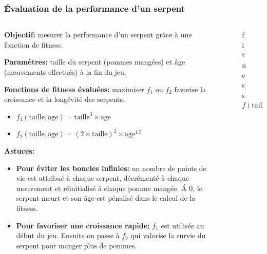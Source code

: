 \documentclass[10pt]{beamer}
\begin{document}
\begin{frame}
\frametitle{\'Evaluation de la performance d'un serpent}
\begin{columns}[T]
\begin{column}{0.60\textwidth}
\footnotesize
\textbf{Objectif:} mesurer la performance d'un serpent grâce à une fonction de fitness.

\vspace{0.1cm}
\textbf{Paramètres:} taille du serpent (pommes mangées) et âge (mouvements effectués) à la fin du jeu.

\vspace{0.1cm}
\textbf{Fonctions de fitness évaluées:} maximiser $f_1$ ou $f_2$ favorise la croissance et la longévité des serpents.
\begin{itemize}
  \footnotesize
  \item $f_1(\text{taille}, \text{age})=\text{taille}^3\times \text{age}$
  \item $f_2(\text{taille}, \text{age})=(2\times\text{taille})^2\times \text{age}^{1.5}$
\end{itemize}
\textbf{Astuces:}
\begin{itemize}
  \footnotesize
  \item \textbf{Pour éviter les boucles infinies:} un nombre de points de vie est attribué à chaque serpent, décrémenté à chaque mouvement et réinitialisé à chaque pomme mangée. \'A 0, le serpent meurt et son âge est pénalisé dans le calcul de la fitness.
  \item \textbf{Pour favoriser une croissance rapide:} $f_1$ est utilisée au début du jeu. Ensuite on passe à $f_2$ qui valorise la survie du serpent pour manger plus de pommes.
\end{itemize}

\end{column}

\begin{column}{0.40\textwidth}
\begin{figure}
\centering
\vspace{-0.5cm}
\vspace{-0.4cm}
\caption*{\tiny fitness $f(\text{taille}, \text{age})=\text{taille}^3\times \text{age}$}
\end{figure}


\end{column}
\end{columns}
\end{frame}
\end{document}
